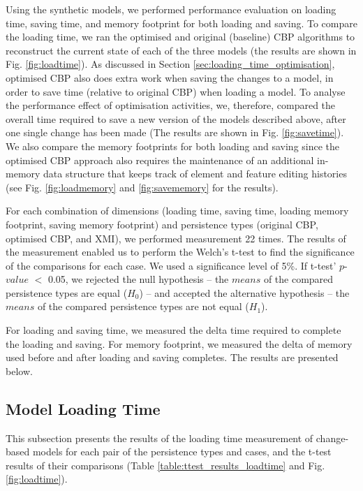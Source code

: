 \documentclass{llncs}
\begin{document}
{Using the synthetic models, we performed performance evaluation on loading time, saving time, and memory footprint for both loading and saving. To compare the loading time, we ran the optimised and original (baseline) CBP algorithms to reconstruct the current state of each of the three models (the results are shown in Fig. \ref{fig:loadtime}). As discussed in Section \ref{sec:loading_time_optimisation}, optimised CBP also does extra work when saving the changes to a model, in order to save time (relative to original CBP) when loading a model. To analyse the performance effect of optimisation activities, we, therefore, compared the overall time required to save a new version of the models described above, after one single change has been made (The results are shown in Fig. \ref{fig:savetime}). We also compare the memory footprints for both loading and saving since the optimised CBP approach also requires the maintenance of an additional in-memory data structure that keeps track of element and feature editing histories (see Fig. \ref{fig:loadmemory} and \ref{fig:savememory} for the results). 

For each combination of dimensions (loading time, saving time, loading memory footprint, saving memory footprint) and persistence types (original CBP, optimised CBP, and XMI), we performed measurement 22 times. The results of the measurement enabled us to perform the Welch's t-test \cite{welch1947ttest} to find the significance of the comparisons for each case. We used a significance level of 5\%. If t-test' $p$-$value$ $<$ 0.05, we rejected the null hypothesis -- the $means$ of the compared persistence types are equal ($H_0$) -- and accepted the alternative hypothesis -- the $means$ of the compared persistence types are not equal ($H_1$).

For loading and saving time, we measured the delta time required to complete the loading and saving. For memory footprint, we measured the delta of memory used before and after loading and saving completes. The results are presented below.

\vspace{-10pt}
\subsection{Model Loading Time}
\label{subsec:loading_time_test}

\vspace{-10pt}
This subsection presents the results of the loading time measurement of change-based models for each pair of the persistence types and cases, and the t-test results of their comparisons (Table \ref{table:ttest_results_loadtime} and Fig. \ref{fig:loadtime}). 

}
\end{document}
